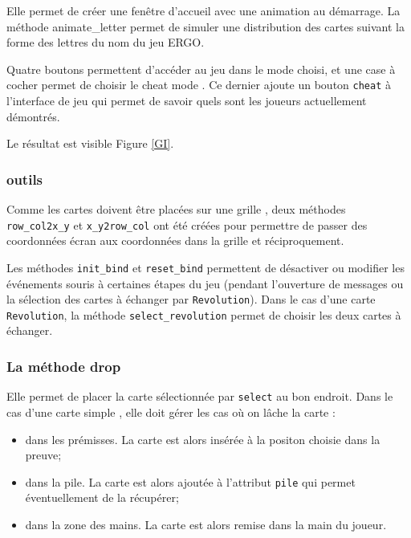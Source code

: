 \documentclass[12pt, a4paper]{article}
\begin{document}
Elle permet de créer une fenêtre d’accueil avec une animation au démarrage. La méthode animate\_letter permet de simuler une distribution des cartes suivant la forme des lettres du nom du jeu ERGO.

Quatre boutons permettent d'accéder au jeu dans le mode choisi, et une case à cocher permet de choisir le \og cheat mode \fg. Ce dernier ajoute un bouton \texttt{cheat} à l'interface de jeu qui permet de savoir quels sont les joueurs actuellement démontrés.

Le résultat est visible Figure \ref{GI}.

\subsubsection{outils}

Comme les cartes doivent être placées sur une \og grille \fg{},  deux méthodes \texttt{row\_col2x\_y} et \texttt{x\_y2row\_col} ont été créées pour permettre de passer des coordonnées écran aux coordonnées dans la grille et réciproquement.

Les méthodes \texttt{init\_bind} et \texttt{reset\_bind} permettent de désactiver ou modifier les événements souris à certaines étapes du jeu (pendant l'ouverture de messages ou la sélection des cartes à échanger par \texttt{Revolution}). Dans le cas d'une carte \texttt{Revolution}, la méthode \texttt{select\_revolution} permet de choisir les deux cartes à échanger.

\subsubsection{La méthode drop}

Elle permet de placer la carte sélectionnée par \texttt{select} au bon endroit. Dans le cas d'une carte \og simple \fg, elle doit gérer les cas où on lâche la carte :

\begin{itemize}
\item dans les prémisses. La carte est alors insérée à la positon choisie dans la preuve;
\item dans la pile. La carte est alors ajoutée à l'attribut \texttt{pile} qui permet éventuellement de la récupérer;
\item dans la zone des mains. La carte est alors remise dans la main du joueur.
\end{itemize}
\end{document}

